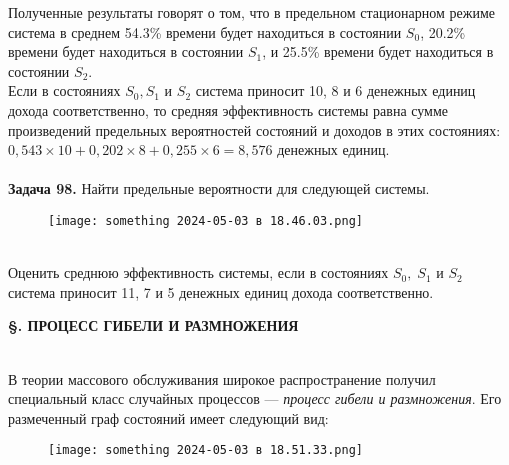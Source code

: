 \documentclass{article}
\begin{document}
Полученные результаты говорят о том, что в предельном стационарном режиме система в среднем 54.3\% времени будет находиться в состоянии $S_0$, 20.2\% времени будет находиться в состоянии $S_1$, и 25.5\% времени будет находиться в состоянии $S_2$.
\\ \indent
Если в состояниях $S_0, S_1$ и $S_2$ система приносит 10, 8 и 6 денежных единиц дохода соответственно, то средняя эффективность системы равна сумме произведений предельных вероятностей состояний и доходов в этих состояниях: $ 0,543 \times 10 + 0,202\times8 + 0,255\times6 = 8,576$ денежных единиц.
\\ \\
\indent \; \; \; \textbf{Задача 98.} Найти предельные вероятности для следующей системы.
\begin{figure}[h] 
\centering
\texttt{[image: something 2024-05-03 в 18.46.03.png]}
\label{fig:my_label}
\end{figure} \\ 
\indent Оценить среднюю эффективность системы, если в состояниях $S_0,  \; S_1$ и $S_2$ система приносит 11, 7 и 5 денежных единиц дохода соответственно.

\begin{center}
\textbf{\S {}.  ПРОЦЕСС  ГИБЕЛИ  И  РАЗМНОЖЕНИЯ}\end{center}
 \\ 
 
\indent В теории массового обслуживания широкое распространение получил  специальный  класс  случайных  процессов  — \textit{процесс  гибели и размножения}. Его размеченный граф состояний имеет следующий вид:


\begin{figure}[h] 
\centering
\texttt{[image: something 2024-05-03 в 18.51.33.png]}
\label{fig:my_label}
\end{figure} \\
\end{document}
